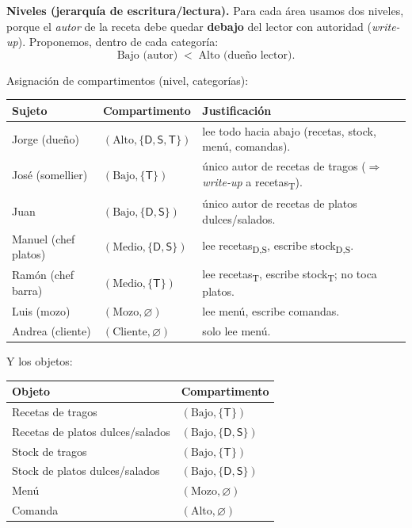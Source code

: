 \textbf{Niveles (jerarquía de escritura/lectura).} Para cada área usamos dos niveles, porque
el \emph{autor} de la receta debe quedar \textbf{debajo} del lector con autoridad
(\emph{write-up}). Proponemos, dentro de cada categoría:
\begin{equation*}
  \text{Bajo (autor)} \;<\; \text{Alto (dueño lector)}.
\end{equation*}

Asignación de compartimentos (nivel, categorías):

\begin{center}
\renewcommand{\arraystretch}{1.25}
\begin{tabular}{l l l}
\toprule
\textbf{Sujeto} & \textbf{Compartimento} & \textbf{Justificación} \\
\midrule
Jorge (dueño) & $(\text{Alto},\{\textsf{D},\textsf{S},\textsf{T}\})$ &
  lee todo hacia abajo (recetas, stock, menú, comandas). \\
José (somellier) & $(\text{Bajo},\{\textsf{T}\})$ &
  único autor de recetas de tragos ($\Rightarrow$ \emph{write-up} a recetas\textsubscript{T}). \\
Juan & $(\text{Bajo},\{\textsf{D},\textsf{S}\})$ &
  único autor de recetas de platos dulces/salados. \\
Manuel (chef platos) & $(\text{Medio},\{\textsf{D},\textsf{S}\})$ &
  lee recetas\textsubscript{D,S}, escribe stock\textsubscript{D,S}. \\
Ramón (chef barra) & $(\text{Medio},\{\textsf{T}\})$ &
  lee recetas\textsubscript{T}, escribe stock\textsubscript{T}; no toca platos. \\
Luis (mozo) & $(\text{Mozo},\varnothing)$ &
  lee menú, escribe comandas. \\
Andrea (cliente) & $(\text{Cliente},\varnothing)$ &
  solo lee menú. \\
\bottomrule
\end{tabular}
\end{center}

\noindent Y los objetos:

\begin{center}
\renewcommand{\arraystretch}{1.25}
\begin{tabular}{l l}
\toprule
\textbf{Objeto} & \textbf{Compartimento} \\
\midrule
Recetas de tragos & $(\text{Bajo},\{\textsf{T}\})$ \\
Recetas de platos dulces/salados & $(\text{Bajo},\{\textsf{D},\textsf{S}\})$ \\
Stock de tragos & $(\text{Bajo},\{\textsf{T}\})$ \\
Stock de platos dulces/salados & $(\text{Bajo},\{\textsf{D},\textsf{S}\})$ \\
Menú & $(\text{Mozo},\varnothing)$ \\
Comanda & $(\text{Alto},\varnothing)$ \\
\bottomrule
\end{tabular}
\end{center}

